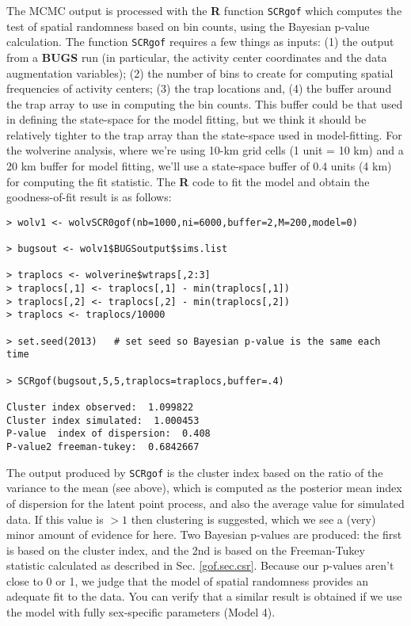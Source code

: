 The MCMC output is processed with  the {\bf R} function
\mbox{\tt SCRgof} which
computes the test of spatial randomness based on bin counts, using the 
Bayesian p-value calculation. The function \mbox{\tt SCRgof} requires
 a few things as inputs: (1) the output from a
{\bf BUGS} run (in particular, the activity center coordinates and the
data augmentation variables); (2) the number of bins to create for
computing spatial frequencies of activity centers;  (3) the trap
locations and, (4) the buffer
around the trap array to use in computing the bin counts.  This buffer could be that used
in defining the state-space for the model fitting, but we think it should be
relatively tighter to the trap array than the state-space used in
model-fitting. For the wolverine analysis,  where we're using 10-km grid cells
(1 unit = 10 km) and a 20 km buffer for model fitting, we'll use a
state-space buffer of  0.4 units (4 km) for
computing the fit statistic.
The {\bf R} code to fit the model and obtain the goodness-of-fit
result is as follows:
{\small
\begin{verbatim}
> wolv1 <- wolvSCR0gof(nb=1000,ni=6000,buffer=2,M=200,model=0)

> bugsout <- wolv1$BUGSoutput$sims.list

> traplocs <- wolverine$wtraps[,2:3]
> traplocs[,1] <- traplocs[,1] - min(traplocs[,1])
> traplocs[,2] <- traplocs[,2] - min(traplocs[,2])
> traplocs <- traplocs/10000

> set.seed(2013)   # set seed so Bayesian p-value is the same each time

> SCRgof(bugsout,5,5,traplocs=traplocs,buffer=.4)

Cluster index observed:  1.099822
Cluster index simulated:  1.000453
P-value  index of dispersion:  0.408
P-value2 freeman-tukey:  0.6842667
\end{verbatim}
}
The output produced by \mbox{\tt SCRgof} is the cluster index based on
the ratio of the variance to the mean
(see above), which is computed as the posterior mean index of
dispersion for the latent point process, and also the average value
for simulated data. If this value is $>1$ then clustering is
suggested, which we see a (very) minor amount of evidence for here. Two
Bayesian p-values are produced: the first is based on the cluster
index, and the 2nd is based on the Freeman-Tukey statistic calculated
as described in Sec. \ref{gof.sec.csr}.  Because our p-values aren't
close to 0 or 1, we judge that the model of spatial randomness
provides an adequate fit to the data. You can verify that a similar result is obtained if
we use the model with fully sex-specific parameters (Model 4).

